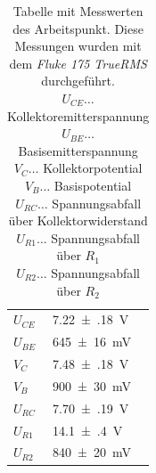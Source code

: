 \documentclass[12pt,english,ngerman]{scrartcl}
\begin{document}
\begin{table}[H]
  \caption{Tabelle mit Messwerten des Arbeitspunkt. Diese Messungen wurden
  mit dem \textit{Fluke 175 TrueRMS} durchgeführt. \\
  $U_{CE} \dots$ Kollektoremitterspannung \\
  $U_{BE} \dots$ Basisemitterspannung \\
  $V_C \dots$  Kollektorpotential \\ 
  $V_B \dots$  Basispotential \\ 
  $U_{RC} \dots$ Spannungsabfall über Kollektorwiderstand  \\ 
  $U_{R1} \dots$ Spannungsabfall über $R_1$ \\
  $U_{R2} \dots$ Spannungsabfall über $R_2$
}
  \label{tab:messugenarbeitspunkt}
  \centering
  \begin{tabular}[c]{l|l}
    $U_{CE}$ &  \SI{7.22(18)}{\volt} \\
    $U_{BE}$ &  \SI{645(16)}{\milli\volt} \\
    $V_C$    &  \SI{7.48(18)}{\volt} \\
    $V_B$    &  \SI{900(30)}{\milli\volt} \\
    $U_{RC}$ &  \SI{7.70(19)}{\volt} \\
    $U_{R1}$ &  \SI{14.1(4)}{\volt} \\
    $U_{R2}$ &  \SI{840(20)}{\milli\volt}
  \end{tabular}
\end{table}


\end{document}
